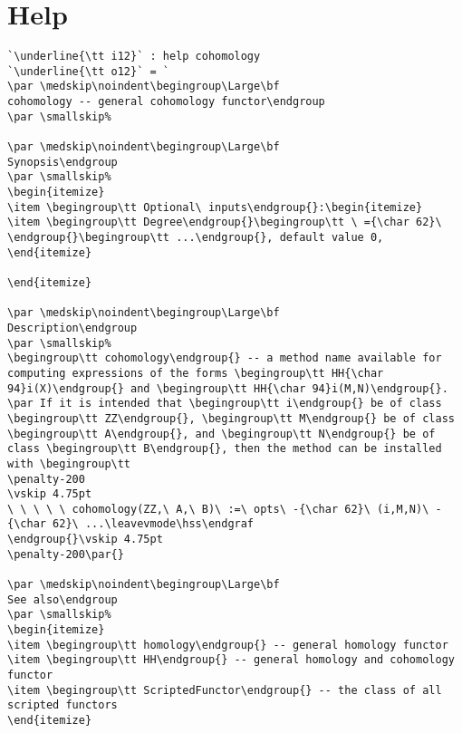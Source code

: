 \documentclass[12pt,a4paper]{amsart}
\begin{document}
\section{Help}
\begin{lstlisting}[language=Macaulay2output]
`\underline{\tt i12}` : help cohomology
`\underline{\tt o12}` = `
\par \medskip\noindent\begingroup\Large\bf
cohomology -- general cohomology functor\endgroup
\par \smallskip%

\par \medskip\noindent\begingroup\Large\bf
Synopsis\endgroup
\par \smallskip%
\begin{itemize}
\item \begingroup\tt Optional\ inputs\endgroup{}:\begin{itemize}
\item \begingroup\tt Degree\endgroup{}\begingroup\tt \ ={\char 62}\ \endgroup{}\begingroup\tt ...\endgroup{}, default value 0, 
\end{itemize}

\end{itemize}

\par \medskip\noindent\begingroup\Large\bf
Description\endgroup
\par \smallskip%
\begingroup\tt cohomology\endgroup{} -- a method name available for computing expressions of the forms \begingroup\tt HH{\char 94}i(X)\endgroup{} and \begingroup\tt HH{\char 94}i(M,N)\endgroup{}.
\par If it is intended that \begingroup\tt i\endgroup{} be of class \begingroup\tt ZZ\endgroup{}, \begingroup\tt M\endgroup{} be of class \begingroup\tt A\endgroup{}, and \begingroup\tt N\endgroup{} be of class \begingroup\tt B\endgroup{}, then the method can be installed with \begingroup\tt 
\penalty-200
\vskip 4.75pt
\ \ \ \ \ cohomology(ZZ,\ A,\ B)\ :=\ opts\ -{\char 62}\ (i,M,N)\ -{\char 62}\ ...\leavevmode\hss\endgraf
\endgroup{}\vskip 4.75pt
\penalty-200\par{}

\par \medskip\noindent\begingroup\Large\bf
See also\endgroup
\par \smallskip%
\begin{itemize}
\item \begingroup\tt homology\endgroup{} -- general homology functor
\item \begingroup\tt HH\endgroup{} -- general homology and cohomology functor
\item \begingroup\tt ScriptedFunctor\endgroup{} -- the class of all scripted functors
\end{itemize}


\end{lstlisting}
\end{document}
